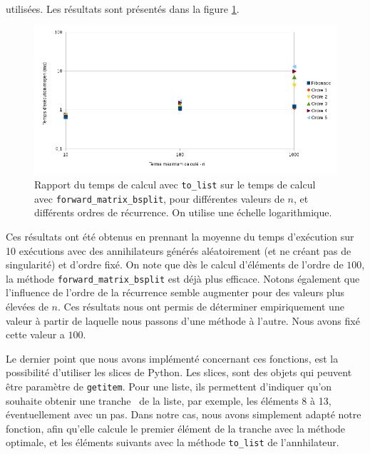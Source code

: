 \documentclass[12pt]{article}
\newlength{\charwidth}
\newcommand{\uline}{\underline{\hspace{2\charwidth}}}
\begin{document}
        utilisées. Les résultats sont présentés dans la figure \ref{fig:getitem}.
        \begin{figure} \begin{center}
            \includegraphics[scale=0.7]{figures/graphe.png}
            \caption{\label{fig:getitem}Rapport du temps de calcul avec \texttt{to\_list} sur le temps
            de calcul avec \texttt{forward\_matrix\_bsplit}, pour différentes valeurs de $n$, et différents
            ordres de récurrence. On utilise une échelle logarithmique.}
        \end{center} \end{figure}
        Ces résultats ont été obtenus en prennant la moyenne du temps d'exécution sur 10 exécutions avec
        des annihilateurs générés aléatoirement (et ne créant pas de singularité) et d'ordre fixé.
        On note que dès le 
        calcul d'éléments de l'ordre de $100$, la méthode \texttt{forward\_matrix\_bsplit} est déjà plus
        efficace. Notons également que l'influence de l'ordre de la récurrence semble augmenter pour 
        des valeurs plus élevées de $n$. 
        Ces résultats nous ont permis de déterminer empiriquement
        une valeur à partir de laquelle nous passons d'une méthode à l'autre. Nous avons fixé cette valeur
        a $100$.\\
        \par Le dernier point que nous avons implémenté concernant ces fonctions,
        est la possibilité d'utiliser les slices de Python. Les slices, sont des objets
        qui peuvent être paramètre de \texttt{\uline getitem\uline}. Pour une liste, ils permettent
        d'indiquer qu'on souhaite obtenir une \og tranche \fg\ de la liste, par exemple, les éléments
        8 à 13, éventuellement avec un pas. Dans notre cas, nous avons simplement adapté notre
        fonction, afin qu'elle calcule le premier élément de la tranche avec la méthode optimale,
        et les éléments suivants avec la méthode \texttt{to\_list} de l'annhilateur.
\end{document}
